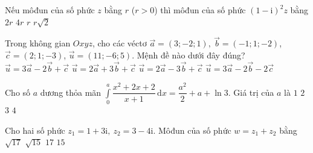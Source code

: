 \begin{ex}%
Nếu môđun của số phức $z$ bằng $r$ ($r>0$) thì môđun của số phức $(1-\mathrm{i})^2z$ bằng
\choice
{\True $2r$}
{$4r$}
{$r$}
{$r\sqrt{2}$}
\end{ex}


\begin{ex}%
Trong không gian $Oxyz$, cho các véctơ $\overrightarrow{a}=(3;-2;1),\ \overrightarrow{b}=(-1;1;-2)$, $\overrightarrow{c}=(2;1;-3)$, $\overrightarrow{u}=(11;-6;5)$. Mệnh đề nào dưới đây đúng?
\choice
{$\overrightarrow{u}=3\overrightarrow{a}-2\overrightarrow{b}+\overrightarrow{c}$}
{$\overrightarrow{u}=2\overrightarrow{a}+3\overrightarrow{b}+\overrightarrow{c}$}
{\True $\overrightarrow{u}=2\overrightarrow{a}-3\overrightarrow{b}+\overrightarrow{c}$}
{$\overrightarrow{u}=3\overrightarrow{a}-2\overrightarrow{b}-2\overrightarrow{c}$}
\end{ex}


\begin{ex}%
Cho số $a$ dương thỏa mãn $\displaystyle\int\limits_{0}^{a}\dfrac{x^2+2x+2}{x+1}\mathrm{\,d} x=\dfrac{a^2}{2}+a+\ln 3$. Giá trị của $a$ là
\choice
{$1$}
{\True $2$}
{$3$}
{$4$}
\end{ex}


\begin{ex}%
Cho hai số phức $z_1=1+3\mathrm{i},\ z_2=3-4\mathrm{i}$. Môđun của số phức $w=z_1+z_2$ bằng
\choice
{\True $\sqrt{17}$}
{$\sqrt{15}$}
{$17$}
{$15$}
\end{ex}


